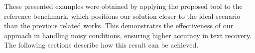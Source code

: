 These presented examples were obtained by applying the proposed tool to the reference benchmark, which positions our solution closer to the ideal scenario than the previous related works. This demonstrates the effectiveness of our approach in handling noisy conditions, ensuring higher accuracy in text recovery. The following sections describe how this result can be achieved.
